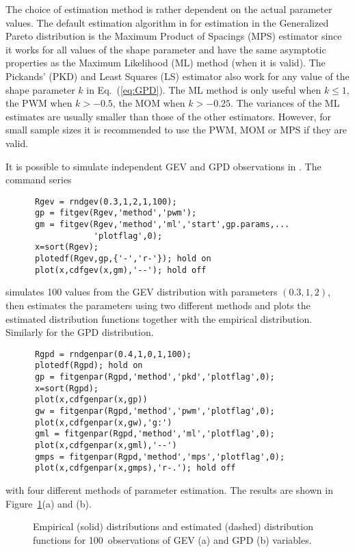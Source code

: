The choice of estimation method is rather dependent on the
actual parameter values.  The default estimation algorithm in
\progname{} for
estimation in the Generalized Pareto distribution is the Maximum
Product of Spacings (MPS) estimator  since it works for all
values of the shape 
  parameter and have the same asymptotic properties as the Maximum
  Likelihood (ML) method  (when it is valid).
The Pickands' (PKD) and Least Squares (LS) estimator also work for
any value of the shape parameter $k$ in Eq.~(\ref{eq:GPD}).
   The ML method is only useful when $k \leq 1$, the PWM when $k>-0.5$,
  the MOM when $k>-0.25$. The variances of the ML estimates are usually
  smaller than those of the other estimators. However, for small sample
  sizes it is recommended to use the PWM, MOM or MPS if they are
  valid.

It is possible to simulate independent GEV and GPD observations in
\progname{}. The command series
{\small\begin{verbatim}
      Rgev = rndgev(0.3,1,2,1,100);
      gp = fitgev(Rgev,'method','pwm');
      gm = fitgev(Rgev,'method','ml','start',gp.params,...
                  'plotflag',0);
      x=sort(Rgev);
      plotedf(Rgev,gp,{'-','r-'}); hold on
      plot(x,cdfgev(x,gm),'--'); hold off
\end{verbatim}}
\noindent
simulates 100 values from the GEV distribution with parameters
$(0.3,1,2)$, then estimates the parameters using two different methods
and plots the estimated distribution functions together with the
empirical distribution. Similarly for the GPD distribution.
{\small\begin{verbatim}
      Rgpd = rndgenpar(0.4,1,0,1,100);
      plotedf(Rgpd); hold on
      gp = fitgenpar(Rgpd,'method','pkd','plotflag',0);
      x=sort(Rgpd);
      plot(x,cdfgenpar(x,gp))
      gw = fitgenpar(Rgpd,'method','pwm','plotflag',0);
      plot(x,cdfgenpar(x,gw),'g:')
      gml = fitgenpar(Rgpd,'method','ml','plotflag',0);
      plot(x,cdfgenpar(x,gml),'--')
      gmps = fitgenpar(Rgpd,'method','mps','plotflag',0);
      plot(x,cdfgenpar(x,gmps),'r-.'); hold off
\end{verbatim}}
\noindent
with four different methods of parameter estimation.
The results are shown in Figure~\ref{fig7-4}(a) and (b).

\begin{figure}
%
\hfill
{}
\vspace{-4mm}
  \caption[Empirical and estimated distribution functions for GEV variables]
{Empirical (solid) distributions and estimated (dashed) distribution functions
  for 100~observations of GEV (a) and GPD (b) variables.}
  \label{fig7-4}
\end{figure}

